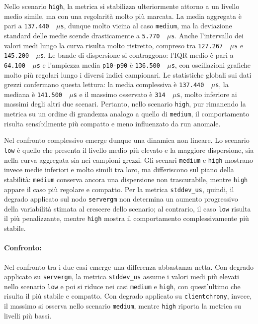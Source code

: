 Nello scenario \texttt{high}, la metrica si stabilizza ulteriormente attorno a
un livello medio simile, ma con una regolarità molto più marcata. La media
aggregata è pari a \texttt{137.440 \,$\mu$s}, dunque molto vicina al caso
\texttt{medium}, ma la deviazione standard delle medie scende drasticamente a
\texttt{5.770 \,$\mu$s}. Anche l'intervallo dei valori medi lungo la curva
risulta molto ristretto, compreso tra \texttt{127.267 \,$\mu$s} e \texttt{145.200
\,$\mu$s}. Le bande di dispersione si contraggono: l'IQR medio è pari a \texttt{64.100
\,$\mu$s} e l'ampiezza media \texttt{p10-p90} è \texttt{136.500 \,$\mu$s}, con oscillazioni
grafiche molto più regolari lungo i diversi indici campionari. Le statistiche
globali sui dati grezzi confermano questa lettura: la media complessiva è \texttt{137.440
\,$\mu$s}, la mediana è \texttt{141.500 \,$\mu$s} e il massimo osservato è
\texttt{314 \,$\mu$s}, molto inferiore ai massimi degli altri due scenari. Pertanto,
nello scenario \texttt{high}, pur rimanendo la metrica su un ordine di grandezza
analogo a quello di \texttt{medium}, il comportamento risulta sensibilmente più
compatto e meno influenzato da run anomale.

Nel confronto complessivo emerge dunque una dinamica non lineare. Lo scenario \texttt{low}
è quello che presenta il livello medio più elevato e la maggiore dispersione, sia
nella curva aggregata sia nei campioni grezzi. Gli scenari \texttt{medium} e \texttt{high}
mostrano invece medie inferiori e molto simili tra loro, ma differiscono sul piano
della stabilità: \texttt{medium} conserva ancora una dispersione non trascurabile,
mentre \texttt{high} appare il caso più regolare e compatto. Per la metrica
\texttt{stddev\_us}, quindi, il degrado applicato sul nodo \texttt{servergm} non
determina un aumento progressivo della variabilità stimata al crescere dello
scenario; al contrario, il caso \texttt{low} risulta il più penalizzante, mentre
\texttt{high} mostra il comportamento complessivamente più stabile.

\paragraph*{Confronto:}
Nel confronto tra i due casi emerge una differenza abbastanza netta. Con degrado applicato
su \texttt{servergm}, la metrica \texttt{stddev\_us} assume i valori medi più
elevati nello scenario \texttt{low} e poi si riduce nei casi \texttt{medium} e
\texttt{high}, con quest'ultimo che risulta il più stabile e compatto. Con degrado
applicato su \texttt{clientchrony}, invece, il massimo si osserva nello scenario
\texttt{medium}, mentre \texttt{high} riporta la metrica su livelli più bassi.

